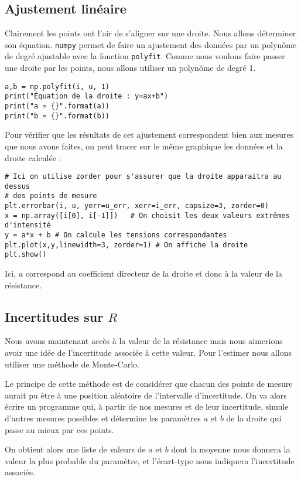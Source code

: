 \documentclass{tp}
\begin{document}
\subsection{Ajustement linéaire}%
\label{sub:ajustement_lineaire}
Clairement les points ont l'air de s'aligner sur une droite. Nous allons déterminer son équation. \texttt{numpy} permet de faire un ajustement des données par un polynôme de degré ajustable avec la fonction \texttt{polyfit}. Comme nous voulons faire passer une droite par les points, nous allons utiliser un polynôme de degré 1.
\begin{verbatim}
a,b = np.polyfit(i, u, 1)
print("Équation de la droite : y=ax+b")
print("a = {}".format(a))
print("b = {}".format(b))
\end{verbatim}
Pour vérifier que les résultats de cet ajustement correspondent bien aux mesures que nous avons faites, on peut tracer sur le même graphique les données et la droite calculée :
\begin{verbatim}
# Ici on utilise zorder pour s'assurer que la droite apparaitra au dessus
# des points de mesure
plt.errorbar(i, u, yerr=u_err, xerr=i_err, capsize=3, zorder=0) 
x = np.array([i[0], i[-1]])   # On choisit les deux valeurs extrêmes d'intensité
y = a*x + b # On calcule les tensions correspondantes
plt.plot(x,y,linewidth=3, zorder=1) # On affiche la droite
plt.show()
\end{verbatim}
% 
Ici, $a$ correspond au coefficient directeur de la droite et donc à la valeur de la résistance.

\subsection{Incertitudes sur $R$}%
\label{sub:incertitudes_sur_r_}
Nous avons maintenant accès à la valeur de la résistance mais nous aimerions avoir une idée de l'incertitude associée à cette valeur. Pour l'estimer nous allons utiliser une méthode de Monte-Carlo.

Le principe de cette méthode est de considérer que chacun des points de mesure aurait pu être à une position aléatoire de l'intervalle d'incertitude. On va alors écrire un programme qui, à partir de nos mesures et de leur incertitude, simule d'autres mesures possibles et détermine les paramètres $a$ et $b$ de la droite qui passe au mieux par ces points. 

On obtient alors une liste de valeurs de $a$ et $b$ dont la moyenne nous donnera la valeur la plus probable du paramètre, et l'écart-type nous indiquera l'incertitude associée.
\end{document}
